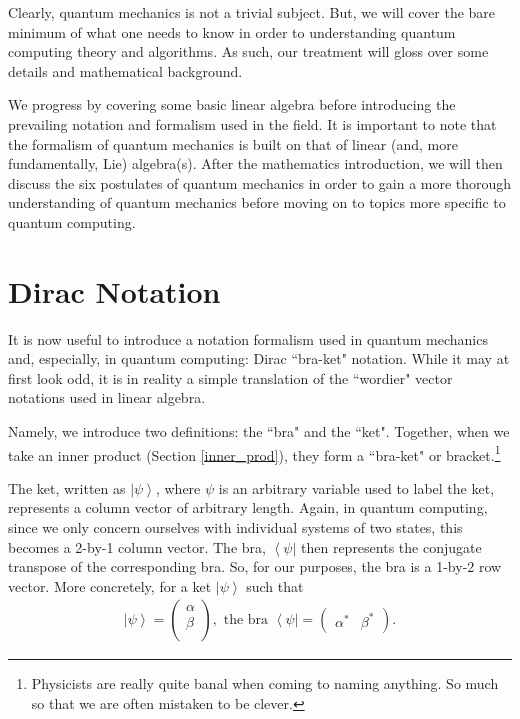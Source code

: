\documentclass[11pt]{article} %
\newcommand{\bra}[1]{\left\langle #1 \right|}
\newcommand{\ket}[1]{\left|#1\right\rangle}
\begin{document}
Clearly, quantum mechanics is not a trivial subject. But, we will cover the bare minimum of what one needs to know in order to understanding quantum computing theory and algorithms. As such, our treatment will gloss over some details and mathematical background. 

We progress by covering some basic linear algebra before introducing the prevailing notation and formalism used in the field. It is important to note that the formalism of quantum mechanics is built on that of linear (and, more fundamentally, Lie) algebra(s). After the mathematics introduction, we will then discuss the six postulates of quantum mechanics in order to gain a more thorough understanding of quantum mechanics before moving on to topics more specific to quantum computing.

\section{Dirac Notation}
It is now useful to introduce a notation formalism used in quantum mechanics and, especially, in quantum computing: Dirac ``bra-ket" notation. While it may at first look odd, it is in reality a simple translation of the ``wordier" vector notations used in linear algebra.

Namely, we introduce two definitions: the ``bra" and the ``ket". Together, when we take an inner product (Section \ref{inner_prod}), they form a ``bra-ket" or bracket.\footnote{Physicists are really quite banal when coming to naming anything. So much so that we are often mistaken to be clever.}

The ket, written as $\ket{\psi}$, where $\psi$ is an arbitrary variable used to label the ket, represents a column vector of arbitrary length. Again, in quantum computing, since we only concern ourselves with individual systems of two states, this becomes a 2-by-1 column vector. The bra, $\bra{\psi}$ then represents the conjugate transpose of the corresponding bra. So, for our purposes, the bra is a 1-by-2 row vector. More concretely, for a ket $\ket{\psi}$ such that
\begin{align}
    \ket{\psi} = 
    \begin{pmatrix}
        \alpha \\
        \beta \\
    \end{pmatrix},
    \textrm{ the bra }
    \bra{\psi} = 
    \begin{pmatrix}
        \alpha^\ast & \beta^\ast
    \end{pmatrix}. \nonumber
\end{align}
\end{document}

